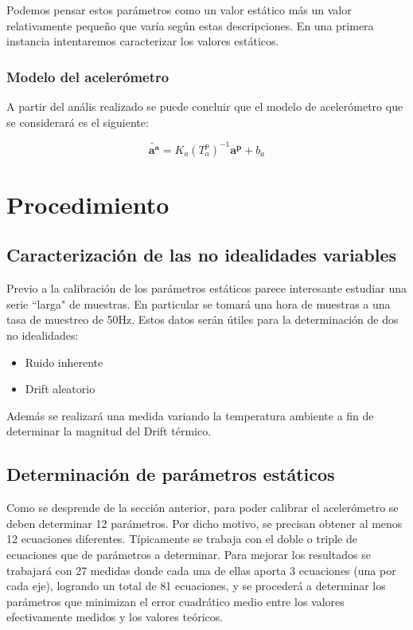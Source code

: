 \documentclass[main]{subfiles}
\begin{document}
Podemos pensar estos parámetros como un valor estático más un valor relativamente pequeño que varía según estas descripciones. 
En una primera instancia intentaremos caracterizar los valores estáticos.   

\subsubsection{Modelo del acelerómetro}

A partir del anális realizado se puede concluir que el modelo de acelerómetro que se considerará es el siguiente:

$$\tilde{\mathbf{a^a}}=K_a(T_a^p)^{-1}\mathbf{a^p}+b_a$$

\section{Procedimiento}
\subsection{Caracterización de las no idealidades variables}

Previo a la calibración de los parámetros estáticos parece interesante estudiar una serie ``larga" de muestras. En particular se tomará una hora de muestras a una tasa de muestreo de 50Hz. Estos datos serán útiles para la determinación de dos no idealidades:  
\begin{itemize}
\item Ruido inherente
\item Drift aleatorio
\end{itemize}

Además se realizará una medida variando la temperatura ambiente a fin de determinar la magnitud del Drift térmico.

\subsection{Determinación de parámetros estáticos}

Como se desprende de la sección anterior, para poder calibrar el acelerómetro se deben determinar 12 parámetros. Por dicho motivo, se precisan obtener al menos 12 ecuaciones diferentes. Típicamente se trabaja con el doble o triple de ecuaciones que de parámetros a determinar. Para mejorar los resultados se trabajará con 27 medidas donde cada una de ellas aporta 3 ecuaciones (una por cada eje), logrando un total de 81 ecuaciones, y se procederá a determinar los parámetros que minimizan el error cuadrático medio entre los valores efectivamente medidos y los valores teóricos. 
\end{document}
